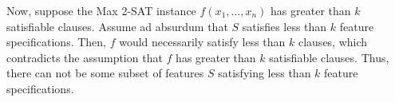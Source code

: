 \documentclass{article}
\begin{document}
\begin{solution}
\begin{subproof}[Correctness.]
Now, suppose the Max 2-SAT instance \( f(x_1, ..., x_n) \) has greater than \( k \) satisfiable clauses.
Assume ad absurdum that \( S \) satisfies less than \( k \) feature specifications.
Then, \( f \) would necessarily satisfy less than \( k \) clauses, which contradicts the assumption that \( f \) has greater than \( k \) satisfiable clauses.
Thus, there can not be some subset of features \( S \) satisfying less than \( k \) feature specifications.
\end{subproof}
\end{solution}
\end{document}
